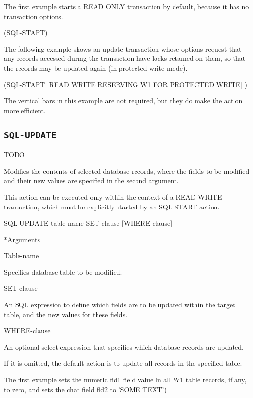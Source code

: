 {{\Example

The first example starts a READ ONLY transaction by default,
because it has no transaction options.



(SQL-START)



The following example shows an update transaction whose
options request that any records accessed during the
transaction have locks retained on them, so that the records
may be updated again (in protected write mode).



(SQL-START |READ WRITE RESERVING W1 FOR PROTECTED WRITE| )



The vertical bars in this example are not required, but they
do make the action more efficient.

\subsection{\tt{SQL-UPDATE}}
TODO

Modifies the contents of selected database records, where the
fields to be modified and their new values are specified in
the second argument.

This action can be executed only within the context of a READ
WRITE transaction, which must be explicitly started by an
SQL-START action.



\Format

SQL-UPDATE table-name SET-clause [WHERE-clause]



*Arguments

Table-name

Specifies database table to be modified.

SET-clause

An SQL expression to define which fields are to be updated
within the target table, and the new values for these fields.

WHERE-clause

An optional select expression that specifies which database
records are updated.

If it is omitted, the default action is to update all records
in the specified table.



\Example

The first example sets the numeric fld1 field value in all W1
table records, if any, to zero, and sets the char field fld2
to 'SOME TEXT')



}}
